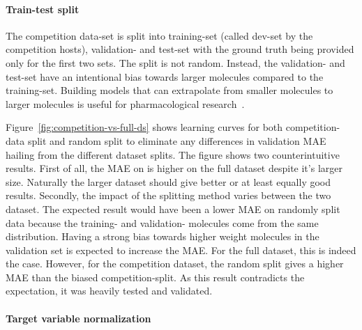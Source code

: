 \paragraph{Train-test split}
The competition data-set is split into training-set (called dev-set by the competition hosts), validation- and test-set with the ground truth being provided only for the first two sets. The split is not random. Instead, the validation- and test-set have an intentional bias towards larger molecules compared to the training-set. Building models that can extrapolate from smaller molecules to larger molecules is useful for pharmacological research~\cite{Chen2019}.

Figure~\ref{fig:competition-vs-full-ds} shows learning curves for both competition-data split and random split to eliminate any differences in validation MAE hailing from the different dataset splits.
The figure shows two counterintuitive results. First of all, the MAE on is higher on the full dataset despite it's larger size. Naturally the larger dataset should give better or at least equally good results. Secondly, the impact of the splitting method varies between the two dataset. The expected result would have been a lower MAE on randomly split data because the training- and validation- molecules come from the same distribution. Having a strong bias towards higher weight molecules in the validation set is expected to increase the MAE. For the full dataset, this is indeed the case. However, for the competition dataset, the random split gives a higher MAE than the biased competition-split. As this result contradicts the expectation, it was heavily tested and validated.



\paragraph{Target variable normalization}

